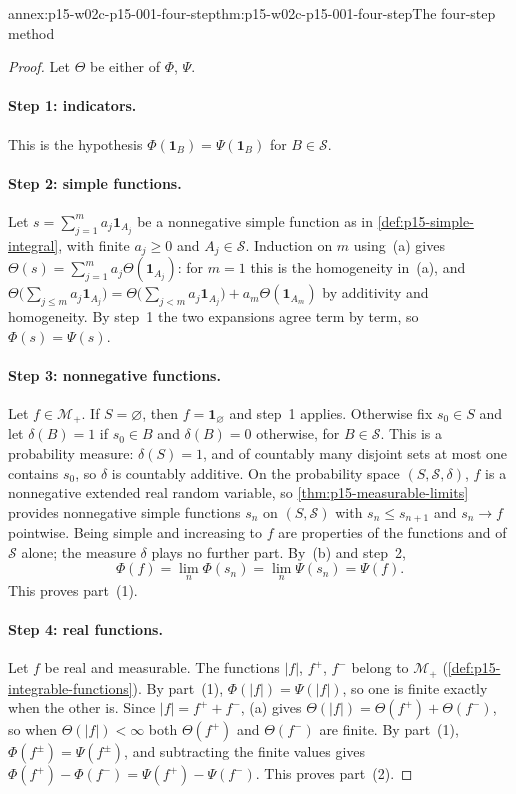 \begin{annexitem}{annex:p15-w02c-p15-001-four-step}{thm:p15-w02c-p15-001-four-step}{The four-step method}
\begin{proof}
Let \(\Theta\) be either of \(\Phi\), \(\Psi\).

\paragraph{Step 1: indicators.}
This is the hypothesis \(\Phi(\mathbf1_B)=\Psi(\mathbf1_B)\) for
\(B\in\mathcal S\).

\paragraph{Step 2: simple functions.}
Let \(s=\sum_{j=1}^ma_j\mathbf1_{A_j}\) be a nonnegative simple function
as in \cref{def:p15-simple-integral}, with finite \(a_j\geq0\) and
\(A_j\in\mathcal S\). Induction on \(m\) using~(a) gives
\(\Theta(s)=\sum_{j=1}^ma_j\Theta(\mathbf1_{A_j})\): for \(m=1\) this is
the homogeneity in~(a), and
\(\Theta\bigl(\sum_{j\leq m}a_j\mathbf1_{A_j}\bigr)
=\Theta\bigl(\sum_{j<m}a_j\mathbf1_{A_j}\bigr)+a_m\Theta(\mathbf1_{A_m})\)
by additivity and homogeneity. By step~1 the two expansions agree term by
term, so \(\Phi(s)=\Psi(s)\).

\paragraph{Step 3: nonnegative functions.}
Let \(f\in\mathcal M_+\). If \(S=\varnothing\), then \(f=\mathbf1_\varnothing\)
and step~1 applies. Otherwise fix \(s_0\in S\) and let
\(\delta(B)=1\) if \(s_0\in B\) and \(\delta(B)=0\) otherwise, for
\(B\in\mathcal S\). This is a probability measure: \(\delta(S)=1\), and
of countably many disjoint sets at most one contains \(s_0\), so
\(\delta\) is countably additive. On the probability space
\((S,\mathcal S,\delta)\), \(f\) is a nonnegative extended real random
variable, so \cref{thm:p15-measurable-limits} provides nonnegative simple
functions \(s_n\) on \((S,\mathcal S)\) with \(s_n\leq s_{n+1}\) and
\(s_n\to f\) pointwise. Being simple and increasing to \(f\) are
properties of the functions and of \(\mathcal S\) alone; the measure
\(\delta\) plays no further part. By~(b) and step~2,
\[
 \Phi(f)=\lim_n\Phi(s_n)=\lim_n\Psi(s_n)=\Psi(f).
\]
This proves part~(1).

\paragraph{Step 4: real functions.}
Let \(f\) be real and measurable. The functions \(|f|\), \(f^+\), \(f^-\)
belong to \(\mathcal M_+\) (\cref{def:p15-integrable-functions}). By
part~(1), \(\Phi(|f|)=\Psi(|f|)\), so one is finite exactly when the
other is. Since \(|f|=f^++f^-\), (a) gives
\(\Theta(|f|)=\Theta(f^+)+\Theta(f^-)\), so when \(\Theta(|f|)<\infty\) both
\(\Theta(f^+)\) and \(\Theta(f^-)\) are finite. By part~(1),
\(\Phi(f^\pm)=\Psi(f^\pm)\), and subtracting the finite values gives
\(\Phi(f^+)-\Phi(f^-)=\Psi(f^+)-\Psi(f^-)\). This proves part~(2).
\end{proof}
\end{annexitem}

